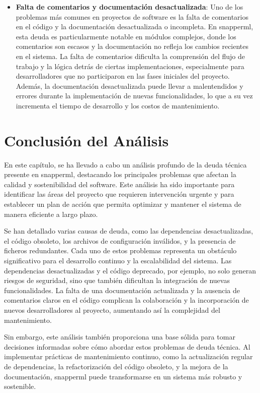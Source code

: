 \begin{itemize}
    \item \textbf{Falta de comentarios y documentación desactualizada}: Uno de los problemas más comunes en proyectos de software es la falta de comentarios en el código y la documentación desactualizada o incompleta. En \Gls{snapperml}, esta \gls{deuda} es particularmente notable en módulos complejos, donde los comentarios son escasos y la documentación no refleja los cambios recientes en el sistema. La falta de comentarios dificulta la comprensión del flujo de trabajo y la lógica detrás de ciertas implementaciones, especialmente para desarrolladores que no participaron en las fases iniciales del proyecto. Además, la documentación desactualizada puede llevar a malentendidos y errores durante la implementación de nuevas funcionalidades, lo que a su vez incrementa el tiempo de desarrollo y los costos de mantenimiento.
\end{itemize}

\section{Conclusión del Análisis}
En este capítulo, se ha llevado a cabo un análisis profundo de la \gls{deuda} técnica presente en \Gls{snapperml}, destacando los principales problemas que afectan la calidad y sostenibilidad del software. Este análisis ha sido importante para identificar las áreas del proyecto que requieren intervención urgente y para establecer un plan de acción que permita optimizar y mantener el sistema de manera eficiente a largo plazo.

Se han detallado varias causas de \gls{deuda}, como las dependencias desactualizadas, el código obsoleto, los archivos de configuración inválidos, y la presencia de ficheros redundantes. Cada uno de estos problemas representa un obstáculo significativo para el desarrollo continuo y la escalabilidad del sistema. Las dependencias desactualizadas y el código deprecado, por ejemplo, no solo generan riesgos de seguridad, sino que también dificultan la integración de nuevas funcionalidades. La falta de una documentación actualizada y la ausencia de comentarios claros en el código complican la colaboración y la incorporación de nuevos desarrolladores al proyecto, aumentando así la complejidad del mantenimiento.

Sin embargo, este análisis también proporciona una base sólida para tomar decisiones informadas sobre cómo abordar estos problemas de \gls{deuda} técnica. Al implementar prácticas de mantenimiento continuo, como la actualización regular de dependencias, la refactorización del código obsoleto, y la mejora de la documentación, \Gls{snapperml} puede transformarse en un sistema más robusto y sostenible.

